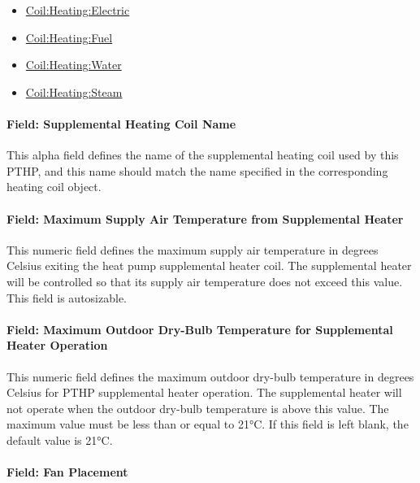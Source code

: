 \begin{itemize}
\item
  \hyperref[coilheatingelectric]{Coil:Heating:Electric}
\item
  \hyperref[coilheatinggas-000]{Coil:Heating:Fuel}
\item
  \hyperref[coilheatingwater]{Coil:Heating:Water}
\item
  \hyperref[coilheatingsteam]{Coil:Heating:Steam}
\end{itemize}

\paragraph{Field: Supplemental Heating Coil Name}\label{field-supplemental-heating-coil-name-000}

This alpha field defines the name of the supplemental heating coil used by this PTHP, and this name should match the name specified in the corresponding heating coil object.

\paragraph{Field: Maximum Supply Air Temperature from Supplemental Heater}\label{field-maximum-supply-air-temperature-from-supplemental-heater-000}

This numeric field defines the maximum supply air temperature in degrees Celsius exiting the heat pump supplemental heater coil. The supplemental heater will be controlled so that its supply air temperature does not exceed this value. This field is autosizable.

\paragraph{Field: Maximum Outdoor Dry-Bulb Temperature for Supplemental Heater Operation}\label{field-maximum-outdoor-dry-bulb-temperature-for-supplemental-heater-operation-000}

This numeric field defines the maximum outdoor dry-bulb temperature in degrees Celsius for PTHP supplemental heater operation. The supplemental heater will not operate when the outdoor dry-bulb temperature is above this value. The maximum value must be less than or equal to 21\si{\degreeCelsius}. If this field is left blank, the default value is 21\si{\degreeCelsius}.

\paragraph{Field: Fan Placement}\label{field-fan-placement-4-000}

